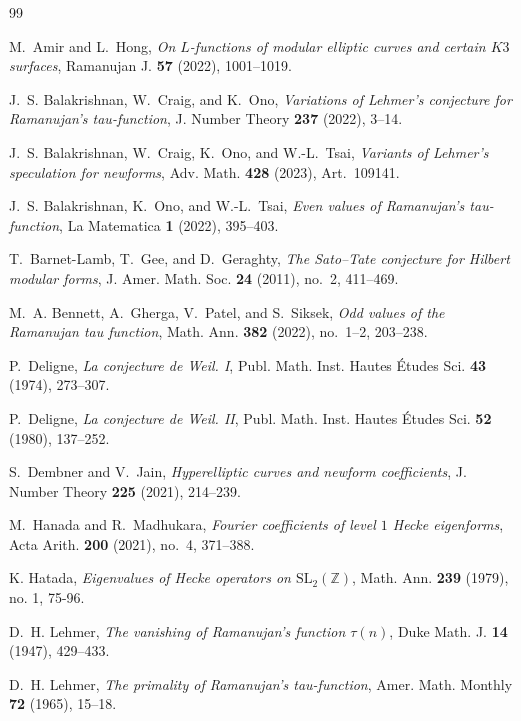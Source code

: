 \documentclass[12pt]{amsart}
\theoremstyle{remark}
\numberwithin{equation}{section}
\begin{document}

\begin{thebibliography}{99}


M.~Amir and L.~Hong,
\emph{On $L$-functions of modular elliptic curves and certain $K3$ surfaces},
Ramanujan J. \textbf{57} (2022), 1001--1019.

J.~S. Balakrishnan, W.~Craig, and K.~Ono,
\emph{Variations of Lehmer's conjecture for Ramanujan's tau-function},
J. Number Theory \textbf{237} (2022), 3--14.

J.~S. Balakrishnan, W.~Craig, K.~Ono, and W.-L.~Tsai,
\emph{Variants of Lehmer's speculation for newforms},
Adv. Math. \textbf{428} (2023), Art.\ 109141.

J.~S. Balakrishnan, K.~Ono, and W.-L.~Tsai,
\emph{Even values of Ramanujan's tau-function},
La Matematica \textbf{1} (2022), 395--403.

T.~Barnet-Lamb, T.~Gee, and D.~Geraghty,
\emph{The Sato--Tate conjecture for Hilbert modular forms},
J. Amer. Math. Soc. \textbf{24} (2011), no.~2, 411--469.

M.~A. Bennett, A.~Gherga, V.~Patel, and S.~Siksek,
\emph{Odd values of the Ramanujan tau function},
Math. Ann. \textbf{382} (2022), no.~1--2, 203--238.

P.~Deligne,
\emph{La conjecture de Weil. I},
Publ. Math. Inst. Hautes \'Etudes Sci. \textbf{43} (1974), 273--307.

P.~Deligne,
\emph{La conjecture de Weil. II},
Publ. Math. Inst. Hautes \'Etudes Sci. \textbf{52} (1980), 137--252.

S.~Dembner and V.~Jain,
\emph{Hyperelliptic curves and newform coefficients},
J. Number Theory \textbf{225} (2021), 214--239.

M.~Hanada and R.~Madhukara,
\emph{Fourier coefficients of level $1$ Hecke eigenforms},
Acta Arith. \textbf{200} (2021), no.~4, 371--388.

 K. Hatada, \emph{Eigenvalues of Hecke operators on $\mathrm{SL}_2(\mathbb{Z})$},
Math. Ann. {\textbf {239}} (1979), no. 1, 75-96.

D.~H. Lehmer,
\emph{The vanishing of Ramanujan's function $\tau(n)$},
Duke Math. J. \textbf{14} (1947), 429--433.

D.~H. Lehmer,
\emph{The primality of Ramanujan's tau-function},
Amer. Math. Monthly \textbf{72} (1965), 15--18.



\end{thebibliography}
\end{document}
